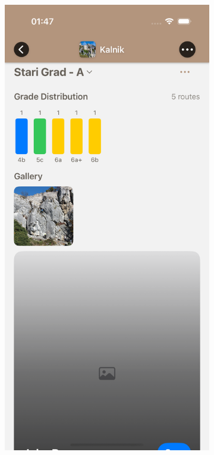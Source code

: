 \begin{figure}[H]
    \centering
    \begin{subfigure}[b]{0.35\textwidth}
        \centering
        \includegraphics[width=\textwidth]{images/implementacija/crag-details/crag-selected-sector.png}

\end{subfigure}
\end{figure}

